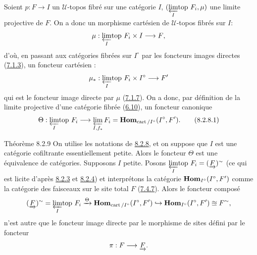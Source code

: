 \documentclass[10pt]{../fichiers-configuration-latex/smfart}
\begin{document}
Soient $p : F \to I$ un $𝒰$-topos fibré sur une catégorie $I$,
$({\displaystyle{\varprojlim_{I}\!\mbox{\rm top }}} F_i, \mu)$ une limite projective de $F$. On a donc un morphisme cartésien
de $𝒰$-topos fibrés sur $I$:
$$
\mu : \limtop{I} F_i \times I \to F{\quoi},
$$
d'où, en passant aux catégories fibrées sur $I^{\circ}$ par les
foncteurs images directes (\hyperref[VI.subsubsec7.1.3]{7.1.3}), un foncteur
cartésien :
$$
\mu_{\ast}: \limtop{I} F_i \times I^{\circ} \to F'
$$
qui est le foncteur image directe par $\mu$ (\hyperref[VI.subsubsec7.1.7]{7.1.7}). On a donc, par
définition de la limite projective d'une catégorie fibrée (\hyperref[VI.subsec6.10]{6.10}), un
foncteur canonique
\begin{equation*}
\Theta : \limtop{I} F_i  \to
\varprojlim_{I, f_{\ast}} F_i = \Hhom_{\cart/I^{\circ}} (I^{\circ},
F'){\quoi}.\tag{8.2.8.1}
\end{equation*}

\begin{enonce*}{Théorème 8.2.9}
On utilise les notations de \hyperref[VI.subsubsec8.2.8]{8.2.8}, et on suppose
que $I$ est une catégorie cofiltrante essentiellement petite. Alors
le foncteur $\Theta$ est une équivalence de catégories. Supposons
$I$ petite. Posons ${\displaystyle{\varprojlim_{I}\!\mbox{\rm top }}} F_i = (\underrightarrow{F})^{\sim}$
(ce qui est licite d'après \hyperref[VI.thm8.2.3]{8.2.3} et \hyperref[VI.rem8.2.4]{8.2.4})
et interprétons la catégorie $\operatorname{\mathbf{Hom}}_{I^{\circ}} (I^{\circ}, F')$
comme la catégorie des faisceaux sur le site total $F$
(\hyperref[VI.prop7.4.7]{7.4.7}). Alors le foncteur composé
$$
(\underrightarrow{F})^{\sim} = {\displaystyle{\varprojlim_{I}\!\mbox{\rm top }}} F_i
\xrightarrow{\Theta} \operatorname{\mathbf{Hom}}_{\operatorname{cart}/I^{\circ}} (I^{\circ}, F') \hookrightarrow \operatorname{\mathbf{Hom}}_{I^{\circ}}
(I^{\circ}, F') \approxeq F^{\sim}{},
$$
n'est autre que le foncteur image directe par le morphisme de sites
défini par le foncteur
$$
\pi : F \to \underrightarrow{F}{\quoi}.
$$
\end{enonce*}

\setcounter{subsubsection}{9}
\subsubsection{}
\end{document}
